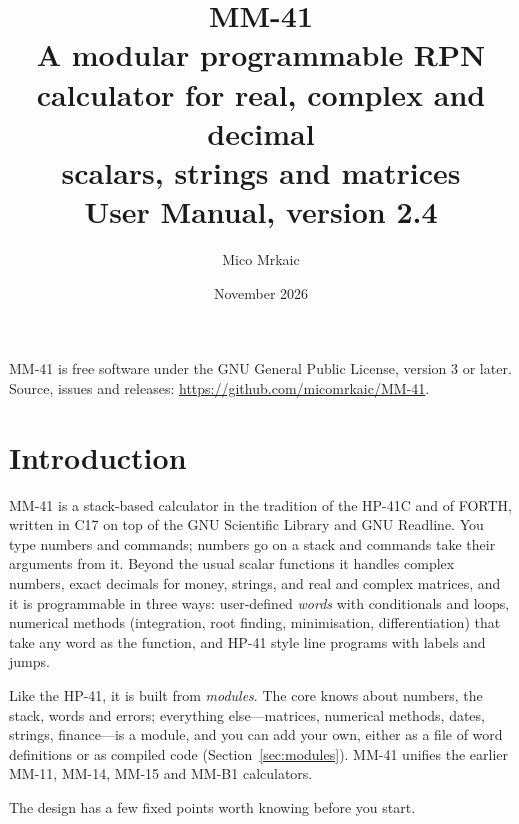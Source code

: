 \documentclass[11pt,letterpaper]{article}
\title{\sffamily\Huge MM-41\\[0.3em]\Large A modular programmable RPN calculator for real, complex and decimal\\scalars, strings and matrices\\[1em]\large User Manual, version 2.4}
\author{Mico Mrkaic}
\date{November 2026}
\begin{document}
\maketitle
\thispagestyle{empty}

\begin{center}
\begin{minipage}{0.8\textwidth}
\small
MM-41 is free software under the GNU General Public License, version 3 or later.
Source, issues and releases: \url{https://github.com/micomrkaic/MM-41}.
\end{minipage}
\end{center}

\vfill
\tableofcontents
\clearpage

\section{Introduction}

MM-41 is a stack-based calculator in the tradition of the HP-41C and of FORTH, written in C17 on top of the GNU Scientific Library and GNU Readline. You type numbers and commands; numbers go on a stack and commands take their arguments from it. Beyond the usual scalar functions it handles complex numbers, exact decimals for money, strings, and real and complex matrices, and it is programmable in three ways: user-defined \emph{words} with conditionals and loops, numerical methods (integration, root finding, minimisation, differentiation) that take any word as the function, and HP-41 style line programs with labels and jumps.

Like the HP-41, it is built from \emph{modules}. The core knows about numbers, the stack, words and errors; everything else---matrices, numerical methods, dates, strings, finance---is a module, and you can add your own, either as a file of word definitions or as compiled code (Section~\ref{sec:modules}). MM-41 unifies the earlier MM-11, MM-14, MM-15 and MM-B1 calculators.

The design has a few fixed points worth knowing before you start.
\end{document}
